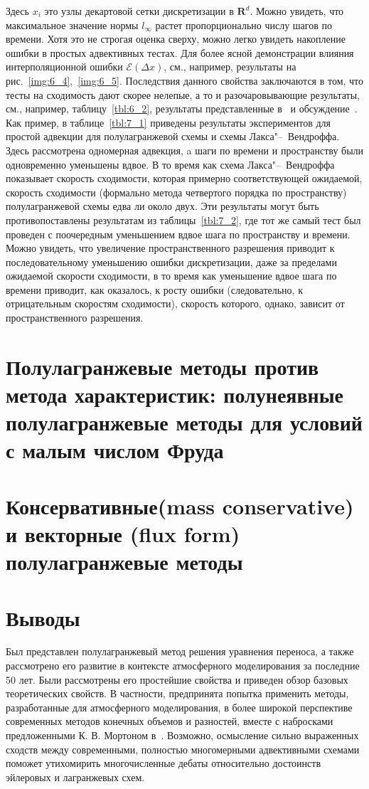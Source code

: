%
Здесь $x_i$ это узлы декартовой сетки дискретизации в $\mathbf{R}^d$. Можно увидеть, что максимальное значение нормы $l_{\infty}$ растет пропорционально числу шагов по времени. Хотя это не строгая оценка сверху, можно легко увидеть накопление ошибки в простых адвективных тестах. Для более ясной демонстрации влияния интерполяционной ошибки $\mathcal{E}(\Delta x)$, см., например, результаты на рис.~\ref{img:6_4},~\ref{img:6_5}. Последствия данного свойства заключаются в том, что тесты на сходимость дают скорее нелепые, а то и разочаровывающие результаты, см., например, таблицу~\ref{tbl:6_2}, результаты представленные в~\cite{A16} и обсуждение~\cite{A26}. Как пример, в таблице~\ref{tbl:7_1} приведены результаты экспериментов для простой адвекции для полулагранжевой схемы и схемы Лакса"--~Вендроффа. Здесь рассмотрена одномерная адвекция, a шаги по времени и пространству были одновременно уменьшены вдвое. В то время как схема Лакса"--~Вендроффа показывает скорость сходимости, которая примерно соответствующей ожидаемой, скорость сходимости (формально метода четвертого порядка по пространству) полулагранжевой схемы едва ли около двух. Эти результаты могут быть противопоставлены результатам из таблицы~\ref{tbl:7_2}, где тот же самый тест был проведен с поочередным уменьшением вдвое шага по пространству и времени. Можно увидеть, что увеличение пространственного разрешения приводит к последовательному уменьшению ошибки дискретизации, даже за пределами ожидаемой скорости сходимости, в то время как уменьшение вдвое шага по времени приводит, как оказалось, к росту ошибки (следовательно, к отрицательным скоростям сходимости), скорость которого, однако, зависит от пространственного разрешения.
\chapter{Полулагранжевые методы против метода характеристик: полунеявные полулагранжевые методы
	 для условий с малым числом Фруда} \label{chapt_8}
\chapter{Консервативные(mass conservative) и векторные (flux form) полулагранжевые методы} \label{chapt_9}
\newpage
\chapter{Выводы} \label{chapt_10}
Был представлен полулагранжевый метод решения уравнения переноса, а также рассмотрено его развитие в контексте атмосферного моделирования за последние 50 лет. Были рассмотрены его простейшие свойства и приведен обзор базовых теоретических свойств. В частности, предпринята попытка применить методы, разработанные для атмосферного моделирования, в более широкой перспективе современных методов конечных объемов и разностей, вместе с набросками предложенными К. В. Мортоном в~\cite{A43}. Возможно, осмысление сильно выраженных сходств между современными, полностью многомерными адвективными схемами поможет утихомирить многочисленные дебаты относительно достоинств эйлеровых и лагранжевых схем.
